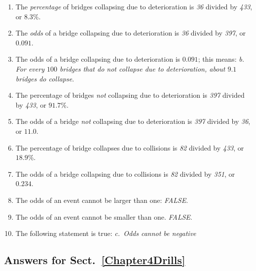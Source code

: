 \documentclass[
  11pt,
  a4paper,
  krantz2]{krantz}
\providecommand{\tightlist}{%
  \setlength{\itemsep}{0pt}\setlength{\parskip}{0pt}}
\begin{document}
\begin{footnotesize}
\begin{enumerate}
\def\labelenumi{\arabic{enumi}.}
\tightlist
\item
  The \emph{percentage} of bridges collapsing due to deterioration is \emph{36} divided by \emph{433}, or \(8.3\)\%.
\item
  The \emph{odds} of a bridge collapsing due to deterioration is \emph{36} divided by \emph{397}, or \(0.091\).
\item
  The odds of a bridge collapsing due to deterioration is \(0.091\); this means: \emph{b. For every \(100\) bridges that do not collapse due to deterioration, about \(9.1\) bridges do collapse}.
\item
  The percentage of bridges \emph{not} collapsing due to deterioration is \emph{397} divided by \emph{433}, or \(91.7\)\%.
\item
  The odds of a bridge \emph{not} collapsing due to deterioration is \emph{397} divided by \emph{36}, or \(11.0\).
\item
  The percentage of bridge collapses due to collisions is \emph{82} divided by \emph{433}, or \(18.9\)\%.
\item
  The odds of a bridge collapsing due to collisions is \emph{82} divided by \emph{351}, or \(0.234\).
\item
  The odds of an event cannot be larger than one: \emph{FALSE}.
\item
  The odds of an event cannot be smaller than one. \emph{FALSE}.
\item
  The following statement is true: \emph{c.~Odds cannot be negative}
\end{enumerate}

\subsection*{Answers for Sect.~\ref{Chapter4Drills}}\label{answers-for-sect.-refchapter4drills}


\end{footnotesize}
\end{document}
